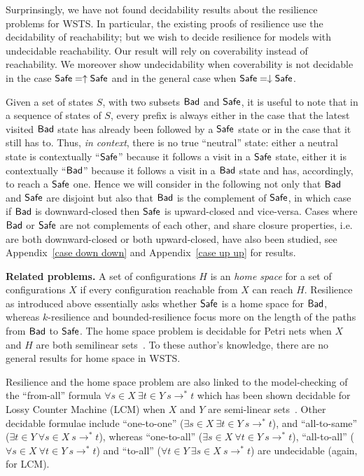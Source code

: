 Surprinsingly, we have not found decidability results about the resilience problems for WSTS.	
In particular, the existing proofs of resilience use the decidability of reachability;
 but we wish to decide resilience for models with undecidable reachability.
Our result will rely on coverability instead of reachability. We moreover show undecidability when coverability is not decidable in the case $\textsf{Safe} = \uparrow \textsf{Safe}$
and in the general case when $\textsf{Safe} = \downarrow \textsf{Safe}$.
 





Given a set of states $S$, with two subsets $\textsf{Bad}$ and $\textsf{Safe}$, it is useful to note that in a sequence of states of $S$, every prefix is always 
either in the case that the latest visited $\textsf{Bad}$ state has already been followed by a 
$\textsf{Safe}$ state
or in the case that it still has to. 
Thus, \emph{in context}, there is no true ``neutral'' state: either a neutral state is contextually ``$\textsf{Safe}$'' because it follows a visit in a $\textsf{Safe}$ state, either it is contextually ``$\textsf{Bad}$'' because it follows a visit in a $\textsf{Bad}$ state and has, accordingly, to reach a $\textsf{Safe}$ one.
Hence we will consider in the following not only that $\textsf{Bad}$ and $\textsf{Safe}$ are disjoint but
	also
that $\textsf{Bad}$ is the complement of $\textsf{Safe}$,
in which case
if $\textsf{Bad}$ is downward-closed then $\textsf{Safe}$ is upward-closed and vice-versa.
Cases where $\textsf{Bad}$ or $\textsf{Safe}$ are not complements of each other, and share closure properties, i.e. are both downward-closed or both upward-closed,
have also been studied, 
see 
Appendix~\ref{case down down}
and
Appendix~\ref{case up up} for results.


{\bf Related problems.} 
A set of configurations $H$ is an {\em home space} for a set of configurations $X$ if every configuration reachable from $X$ can reach $H$. Resilience as introduced above essentially asks whether $\textsf{Safe}$ is a home space for $\textsf{Bad}$, whereas $k$-resilience and bounded-resilience focus more on the length of the paths from $\textsf{Bad}$ to $\textsf{Safe}$. The home space problem is decidable for
Petri nets when $X$ and $H$ are both semilinear sets~\cite{DBLP:journals/corr/abs-2207-02697}.
To these author's knowledge, there are no general results for home space in WSTS.

Resilience and the home space problem are also linked to the 
model-checking of the ``from-all'' formula $\forall s \in X~ \exists t \in Y~ s \to^* t$
which has been shown decidable for Lossy Counter Machine (LCM)
when $X$ and $Y$ are semi-linear sets~\cite{DBLP:conf/rp/Schnoebelen10}.
Other decidable formulae include ``one-to-one'' ($\exists s \in  X ~ \exists t \in  Y ~ s \to^* 
 t$), and ``all-to-same'' ($\exists t \in  Y ~ \forall s \in  X ~ s \to^*  t$),
whereas ``one-to-all'' ($\exists s \in  X ~ \forall t \in  Y ~ s \to^*  t$), 
``all-to-all'' ($\forall s \in  X ~ \forall t \in  Y ~ s \to^*  t$)
  and ``to-all'' ($\forall t \in  Y  ~ \exists s \in  X ~ s \to^*  t$) are undecidable (again, for LCM). 
  

